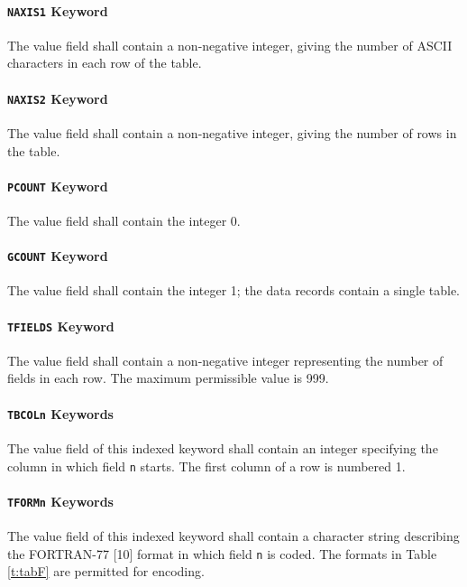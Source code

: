    \paragraph{{\tt NAXIS1} Keyword}
 The value field shall contain a non-negative integer, 
 giving
 the number of ASCII characters in each row of the table.
  
   \paragraph{{\tt NAXIS2} Keyword}
 The value field shall contain a non-negative integer, 
 giving
 the number of rows in the table.
  
   \paragraph{{\tt PCOUNT} Keyword}
 The value field shall contain the integer 0. 
  
   \paragraph{{\tt GCOUNT} Keyword}
 The value field shall contain the integer 1; the data
 records contain a single table.
  
   \paragraph{{\tt TFIELDS} Keyword}
 The value field shall contain a non-negative integer 
 representing
 the number of fields in each row.  The maximum
 permissible value is 999.
  
   \paragraph{{\tt TBCOLn} Keywords}
 The value field of this indexed keyword shall contain an 
 integer
 specifying the column in which field {\tt n} starts.  
 The first column of a row is numbered 1.
           
   \paragraph{{\tt TFORMn} Keywords}
 The value field of this indexed keyword shall contain a
 character string
 describing the FORTRAN-77 [10] format
 in which field {\tt n} is
 coded. The formats
 in Table \ref{t:tabF} are permitted for encoding.

